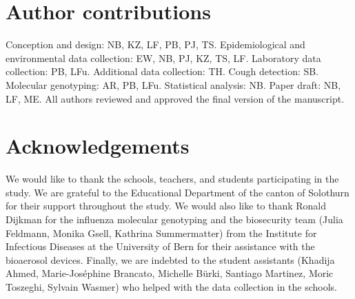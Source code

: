 \documentclass[fleqn,11pt]{wlscirep}
\begin{document}
\section*{Author contributions}
Conception and design: NB, KZ, LF, PB, PJ, TS. Epidemiological and environmental data collection: EW, NB, PJ, KZ, TS, LF. Laboratory data collection: PB, LFu. Additional data collection: TH. Cough detection: SB. Molecular genotyping: AR, PB, LFu. Statistical analysis: NB. Paper draft: NB, LF, ME. All authors reviewed and approved the final version of the manuscript.

\section*{Acknowledgements}
We would like to thank the schools, teachers, and students participating in the study. We are grateful to the Educational Department of the canton of Solothurn for their support throughout the study. We would also like to thank Ronald Dijkman for the influenza molecular genotyping and the biosecurity team (Julia Feldmann, Monika Gsell, Kathrina Summermatter) from the Institute for Infectious Diseases at the University of Bern for their assistance with the bioaerosol devices. Finally, we are indebted to the student assistants (Khadija Ahmed, Marie-Joséphine Brancato, Michelle Bürki, Santiago Martinez, Moric Toszeghi, Sylvain Wasmer) who helped with the data collection in the schools.


\end{document}
